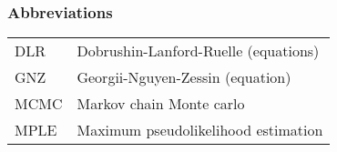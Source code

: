 \documentclass[12pt,a4paper]{report}
\let\openright=\clearpage
\theoremstyle{definition}
\theoremstyle{remark}
\theoremstyle{theorem}
\theoremstyle{remark}
\begin{document}
\subsubsection{Abbreviations}
\begin{tabular}{ l l }
	DLR & Dobrushin-Lanford-Ruelle (equations) \\
	GNZ & Georgii-Nguyen-Zessin (equation) \\
	MCMC & Markov chain Monte carlo \\
	MPLE & Maximum pseudolikelihood estimation
\end{tabular}
















\listoffigures

\listoftables







\openright
\end{document}
